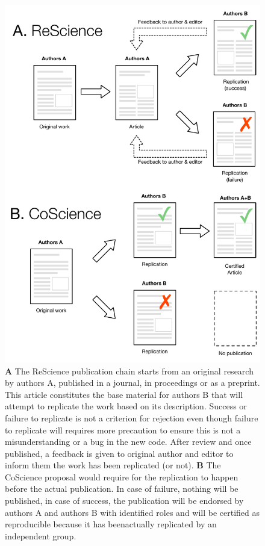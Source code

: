 \documentclass[a4paper,10pt, twocolumn]{article}
\begin{document}

\begin{figure}
  \includegraphics[width=1.0\columnwidth]{CoScience}
  \caption{\textbf{A} The ReScience publication chain starts from an original
    research by authors A, published in a journal, in proceedings or as a
    preprint. This article constitutes the base material for authors B that
    will attempt to replicate the work based on its description. Success or
    failure to replicate is not a criterion for rejection even though failure
    to replicate will requires more precaution to ensure this is not a
    misunderstanding or a bug in the new code. After review and once published,
    a feedback is given to original author and editor to inform them the work
    has been replicated (or not). \textbf{B} The CoScience proposal would
    require for the replication to happen before the actual publication. In
    case of failure, nothing will be published, in case of success, the
    publication will be endorsed by authors A and authors B with identified
    roles and will be certified as reproducible because it has beenactually
    replicated by an independent group.}
\end{figure}
\end{document}
